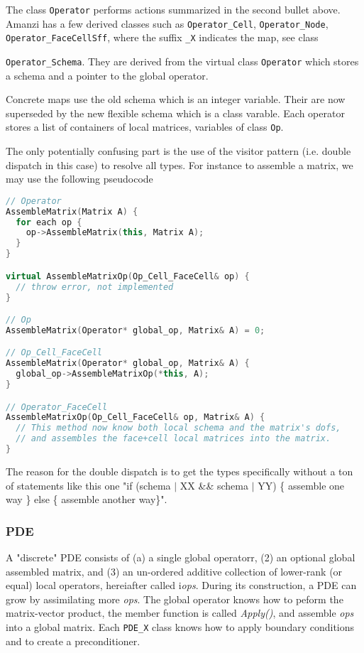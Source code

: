 The class {\tt Operator} performs actions summarized in the second bullet above. 
Amanzi has a few derived classes such as {\tt Operator\_Cell}, {\tt Operator\_Node}, 
{\tt Operator\_FaceCellSff}, where the suffix {\tt \_X} indicates the map, see
class {{\tt Operator\_Schema}.
They are derived from the virtual class {\tt Operator} which stores a
schema and a pointer to the global operator.

Concrete maps use the old schema which is an integer variable.
Their are now superseded by the new flexible schema which is a class varable.
Each operator stores a list of containers of local matrices, variables of class {\tt Op}.

The only potentially confusing part is the use of the visitor pattern (i.e. double 
dispatch in this case) to resolve all types.  
For instance to assemble a matrix, we may use the following pseudocode

\begin{lstlisting}[language=C++]
// Operator
AssembleMatrix(Matrix A) {
  for each op {
    op->AssembleMatrix(this, Matrix A);
  }
}

virtual AssembleMatrixOp(Op_Cell_FaceCell& op) { 
  // throw error, not implemented
}

// Op
AssembleMatrix(Operator* global_op, Matrix& A) = 0;

// Op_Cell_FaceCell
AssembleMatrix(Operator* global_op, Matrix& A) {
  global_op->AssembleMatrixOp(*this, A);
}

// Operator_FaceCell
AssembleMatrixOp(Op_Cell_FaceCell& op, Matrix& A) {
  // This method now know both local schema and the matrix's dofs, 
  // and assembles the face+cell local matrices into the matrix.
}
\end{lstlisting}

The reason for the double dispatch is to get the types specifically
without a ton of statements like this one "if (schema $|$ XX \&\& schema $|$ YY) 
\{ assemble one way \} else \{ assemble another way\}".


\subsubsection{PDE}
A "discrete" PDE consists of (a) a single global operatorr, (2) an 
optional global assembled matrix, and (3) an un-ordered additive collection of 
lower-rank (or equal) local operators, hereiafter called i{\it ops}. 
During its construction, a PDE can grow by assimilating more {\it ops}. 
The global operator knows how to peform the matrix-vector product, the member function 
is called {\it Apply()}, and assemble {\it ops} into a global matrix.
Each {\tt PDE\_X} class knows how to apply boundary conditions and to create a preconditioner.

}

